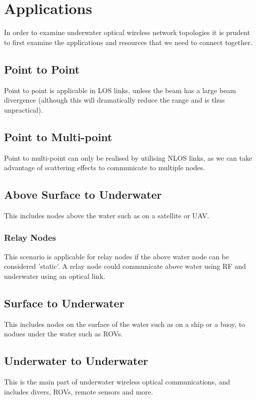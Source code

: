 \section{Applications}
In order to examine underwater optical wireless network topologies
it is prudent to first examine the applications and resources that
we need to connect together.

\subsection{Point to Point}
Point to point is applicable in \ac{LOS} links, unless the beam has a large
beam divergence (although this will dramatically reduce the range and is
thus unpractical).

\subsection{Point to Multi-point}
Point to multi-point can only be realised by utilising \ac{NLOS} links, as
we can take advantage of scattering effects to communicate to multiple nodes.

\subsection{Above Surface to Underwater}
This includes nodes above the water such as on a satellite or \ac{UAV}.

\subsubsection{Relay Nodes}
This scenario is applicable for relay nodes if the above water node
can be considered 'static'. A relay node could communicate above water
using RF and underwater using an optical link.

\subsection{Surface to Underwater}
This includes nodes on the surface of the water such as on a ship
or a buoy, to nodues under the water such as \ac{ROV}s.

\subsection{Underwater to Underwater}
This is the main part of underwater wireless optical communications, and
includes divers, \ac{ROV}s, remote sensors and more.

